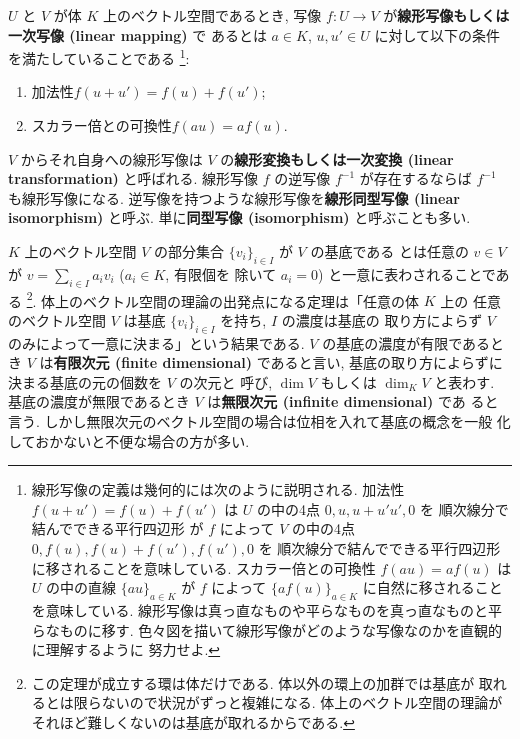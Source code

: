 \documentclass[12pt,twoside]{jarticle}
\begin{document}
$U$ と $V$ が体 $K$ 上のベクトル空間であるとき, 
写像 $f:U\to V$ が{\bf 線形写像もしくは一次写像 (linear mapping)} で
あるとは $a\in K$, $u,u'\in U$ に対して以下の条件を満たしていることである%
\footnote{線形写像の定義は幾何的には次のように説明される.  
  加法性 $f(u+u')=f(u)+f(u')$ は $U$ の中の4点 $0, u, u+u' u', 0$ を
  順次線分で結んでできる平行四辺形
  が $f$ によって $V$ の中の4点 $0, f(u), f(u)+f(u'), f(u'), 0$ を
  順次線分で結んでできる平行四辺形に移されることを意味している.
  スカラー倍との可換性 $f(au)=af(u)$ は $U$ の中の直線 $\{au\}_{a\in K}$ 
  が $f$ によって $\{af(u)\}_{a\in K}$ に自然に移されることを意味している.
  線形写像は真っ直なものや平らなものを真っ直なものと平らなものに移す.
  色々図を描いて線形写像がどのような写像なのかを直観的に理解するように
  努力せよ.}:
\begin{enumerate}
\item 加法性\quad $f(u+u')=f(u)+f(u')$;
\item スカラー倍との可換性\quad $f(au)=af(u)$.
\end{enumerate}
$V$ からそれ自身への線形写像は $V$ の{\bf 線形変換もしくは一次変換 (linear
transformation)} と呼ばれる.
線形写像 $f$ の逆写像 $f^{-1}$ が存在するならば $f^{-1}$ も線形写像になる.
逆写像を持つような線形写像を{\bf 線形同型写像 (linear isomorphism)} と呼ぶ.
単に{\bf 同型写像 (isomorphism)} と呼ぶことも多い. 

\medskip

$K$ 上のベクトル空間 $V$ の部分集合 $\{v_i\}_{i\in I}$ が $V$ の基底である
とは任意の $v\in V$ が $v=\sum_{i\in I} a_i v_i$ ($a_i\in K$, 有限個を
除いて $a_i=0$) と一意に表わされることである%
\footnote{この定理が成立する環は体だけである.  体以外の環上の加群では基底が
  取れるとは限らないので状況がずっと複雑になる.  体上のベクトル空間の理論が
  それほど難しくないのは基底が取れるからである.}.  
体上のベクトル空間の理論の出発点になる定理は「任意の体 $K$ 上の
任意のベクトル空間 $V$ は基底 $\{v_i\}_{i\in I}$ を持ち, $I$ の濃度は基底の
取り方によらず $V$ のみによって一意に決まる」という結果である.
$V$ の基底の濃度が有限であるとき $V$ は{\bf 有限次元 (finite dimensional)} 
であると言い, 基底の取り方によらずに決まる基底の元の個数を $V$ の次元と
呼び, $\dim V$ もしくは $\dim_K V$ と表わす.  
基底の濃度が無限であるとき $V$ は{\bf 無限次元 (infinite dimensional)} であ
ると言う.  しかし無限次元のベクトル空間の場合は位相を入れて基底の概念を一般
化しておかないと不便な場合の方が多い. 

\medskip
\end{document}

